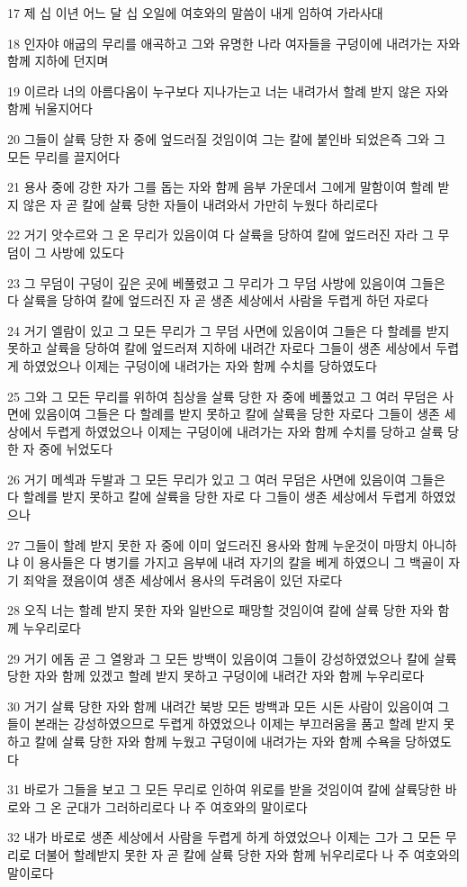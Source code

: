 \par 17 제 십 이년 어느 달 십 오일에 여호와의 말씀이 내게 임하여 가라사대
\par 18 인자야 애굽의 무리를 애곡하고 그와 유명한 나라 여자들을 구덩이에 내려가는 자와 함께 지하에 던지며
\par 19 이르라 너의 아름다움이 누구보다 지나가는고 너는 내려가서 할례 받지 않은 자와 함께 뉘울지어다
\par 20 그들이 살륙 당한 자 중에 엎드러질 것임이여 그는 칼에 붙인바 되었은즉 그와 그 모든 무리를 끌지어다
\par 21 용사 중에 강한 자가 그를 돕는 자와 함께 음부 가운데서 그에게 말함이여 할례 받지 않은 자 곧 칼에 살륙 당한 자들이 내려와서 가만히 누웠다 하리로다
\par 22 거기 앗수르와 그 온 무리가 있음이여 다 살륙을 당하여 칼에 엎드러진 자라 그 무덤이 그 사방에 있도다
\par 23 그 무덤이 구덩이 깊은 곳에 베풀렸고 그 무리가 그 무덤 사방에 있음이여 그들은 다 살륙을 당하여 칼에 엎드러진 자 곧 생존 세상에서 사람을 두렵게 하던 자로다
\par 24 거기 엘람이 있고 그 모든 무리가 그 무덤 사면에 있음이여 그들은 다 할례를 받지 못하고 살륙을 당하여 칼에 엎드러져 지하에 내려간 자로다 그들이 생존 세상에서 두렵게 하였었으나 이제는 구덩이에 내려가는 자와 함께 수치를 당하였도다
\par 25 그와 그 모든 무리를 위하여 침상을 살륙 당한 자 중에 베풀었고 그 여러 무덤은 사면에 있음이여 그들은 다 할례를 받지 못하고 칼에 살륙을 당한 자로다 그들이 생존 세상에서 두렵게 하였었으나 이제는 구덩이에 내려가는 자와 함께 수치를 당하고 살륙 당한 자 중에 뉘었도다
\par 26 거기 메섹과 두발과 그 모든 무리가 있고 그 여러 무덤은 사면에 있음이여 그들은 다 할례를 받지 못하고 칼에 살륙을 당한 자로 다 그들이 생존 세상에서 두렵게 하였었으나
\par 27 그들이 할례 받지 못한 자 중에 이미 엎드러진 용사와 함께 누운것이 마땅치 아니하냐 이 용사들은 다 병기를 가지고 음부에 내려 자기의 칼을 베게 하였으니 그 백골이 자기 죄악을 졌음이여 생존 세상에서 용사의 두려움이 있던 자로다
\par 28 오직 너는 할례 받지 못한 자와 일반으로 패망할 것임이여 칼에 살륙 당한 자와 함께 누우리로다
\par 29 거기 에돔 곧 그 열왕과 그 모든 방백이 있음이여 그들이 강성하였었으나 칼에 살륙 당한 자와 함께 있겠고 할례 받지 못하고 구덩이에 내려간 자와 함께 누우리로다
\par 30 거기 살륙 당한 자와 함께 내려간 북방 모든 방백과 모든 시돈 사람이 있음이여 그들이 본래는 강성하였으므로 두렵게 하였었으나 이제는 부끄러움을 품고 할례 받지 못하고 칼에 살륙 당한 자와 함께 누웠고 구덩이에 내려가는 자와 함께 수욕을 당하였도다
\par 31 바로가 그들을 보고 그 모든 무리로 인하여 위로를 받을 것임이여 칼에 살륙당한 바로와 그 온 군대가 그러하리로다 나 주 여호와의 말이로다
\par 32 내가 바로로 생존 세상에서 사람을 두렵게 하게 하였었으나 이제는 그가 그 모든 무리로 더불어 할례받지 못한 자 곧 칼에 살륙 당한 자와 함께 뉘우리로다 나 주 여호와의 말이로다

